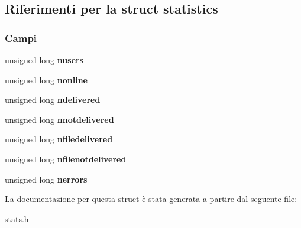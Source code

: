 \hypertarget{structstatistics}{}\subsection{Riferimenti per la struct statistics}
\label{structstatistics}
\subsubsection*{Campi}
\begin{DoxyCompactItemize}
\item 
\mbox{\label{structstatistics_a390a45ca74cf019667fcf33848a33d13}} 
unsigned long {\bfseries nusers}
\item 
\mbox{\label{structstatistics_afe88b6c92f8cc91e152216167f2b6046}} 
unsigned long {\bfseries nonline}
\item 
\mbox{\label{structstatistics_ac09e24f0d5aa3c8255f734ff040f998e}} 
unsigned long {\bfseries ndelivered}
\item 
\mbox{\label{structstatistics_a7d8cbe9fc73479a941714316b48ffd48}} 
unsigned long {\bfseries nnotdelivered}
\item 
\mbox{\label{structstatistics_a87279336813cee36c18e6299606b1dd8}} 
unsigned long {\bfseries nfiledelivered}
\item 
\mbox{\label{structstatistics_a82667eb0d0b1a45917193e9e1d6d463a}} 
unsigned long {\bfseries nfilenotdelivered}
\item 
\mbox{\label{structstatistics_a893b0a0d9f1fe9a6b9cf61d1f020f265}} 
unsigned long {\bfseries nerrors}
\end{DoxyCompactItemize}


La documentazione per questa struct è stata generata a partire dal seguente file\+:\begin{DoxyCompactItemize}
\item 
\mbox{\hyperlink{stats_8h}{stats.\+h}}\end{DoxyCompactItemize}
